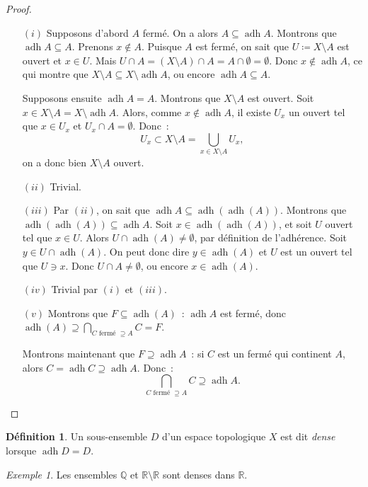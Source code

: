 \documentclass{report}
\theoremstyle{definition}
\newtheorem{déf}[thm]{Définition}
\theoremstyle{remark}
\newtheorem{ex}{Exemple}[chapter]
\DeclareMathOperator{\adh}{adh}
\newcommand{\R}{\mathbb R}
\newcommand{\Q}{\mathbb Q}
\begin{document}
		\begin{proof}~
		\begin{itemize}
			\item[$(i)$] Supposons d'abord $A$ fermé. On a alors $A \subseteq \adh A$. Montrons que $\adh A \subseteq A$. Prenons $x \not \in A$. Puisque $A$
			est fermé, on sait que $U \coloneqq X \setminus A$ est ouvert et $x \in U$. Mais $U \cap A = (X \setminus A) \cap A = A \cap \emptyset = \emptyset$.
			Donc $x \not \in \adh A$, ce qui montre que $X \setminus A \subseteq X \setminus \adh A$, ou encore $\adh A \subseteq A$.

			Supposons ensuite $\adh A = A$. Montrons que $X \setminus A$ est ouvert. Soit $x \in X \setminus A = X \setminus \adh A$. Alors, comme
			$x \not \in \adh A$, il existe $U_x$ un ouvert tel que $x \in U_x$ et $U_x \cap A = \emptyset$. Donc~:
			\[U_x \subset X \setminus A = \bigcup_{x \in X \setminus A}U_x,\]
			on a donc bien $X \setminus A$ ouvert.

			\item[$(ii)$] Trivial.
			\item[$(iii)$] Par $(ii)$, on sait que $\adh A \subseteq \adh(\adh(A))$. Montrons que $\adh(\adh(A)) \subseteq \adh A$. Soit $x \in \adh(\adh(A))$,
			et soit $U$ ouvert tel que $x \in U$. Alors $U \cap \adh(A) \neq \emptyset$, par définition de l'adhérence. Soit $y \in U \cap \adh(A)$. On peut
			donc dire $y \in \adh(A)$ et $U$ est un ouvert tel que $U \ni x$. Donc $U \cap A \neq \emptyset$, ou encore $x \in \adh(A)$.

			\item[$(iv)$] Trivial par $(i)$ et $(iii)$.
			\item[$(v)$] Montrons que $F \subseteq \adh(A)$~: $\adh A$ est fermé, donc $\adh(A) \supseteq \bigcap_{C \text{ fermé } \supseteq A}C = F$.

			Montrons maintenant que $F \supseteq \adh A$~: si $C$ est un fermé qui continent $A$, alors $C = \adh C \supseteq \adh A$. Donc~:
			\[\bigcap_{C \text{ fermé } \supseteq A}C \supseteq \adh A.\]
		\end{itemize}
		\end{proof}

		\begin{déf} Un sous-ensemble $D$ d'un espace topologique $X$ est dit \textit{dense} lorsque $\adh D = D$.
		\end{déf}

		\begin{ex} Les ensembles $\Q$ et $\R \setminus \R$ sont denses dans $\R$.
		\end{ex}
\end{document}
